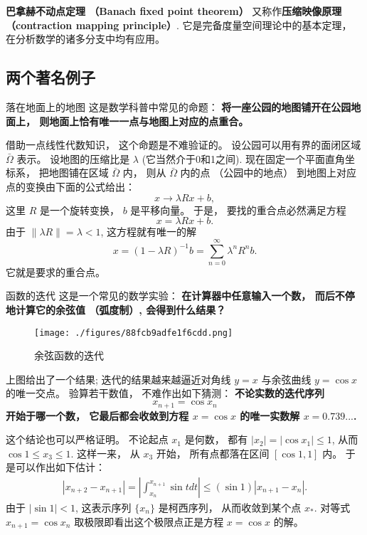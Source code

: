 

\textbf{巴拿赫不动点定理 （Banach fixed point theorem）} 又称作\textbf{压缩映像原理 （contraction mapping principle）}. 它是完备度量空间理论中的基本定理， 在分析数学的诸多分支中均有应用。

\subsection{两个著名例子}
\begin{example}{落在地面上的地图}
这是数学科普中常见的命题： \textbf{将一座公园的地图铺开在公园地面上， 则地面上恰有唯一一点与地图上对应的点重合。} 

借助一点线性代数知识， 这个命题是不难验证的。 设公园可以用有界的面闭区域 $\bar\Omega$ 表示。 设地图的压缩比是 $\lambda$ (它当然介于0和1之间). 现在固定一个平面直角坐标系， 把地图铺在区域 $\bar\Omega$ 内， 则从 $\bar\Omega$ 内的点 （公园中的地点） 到地图上对应点的变换由下面的公式给出：
$$
x\to \lambda Rx+b,
$$
这里 $R$ 是一个旋转变换， $b$ 是平移向量。 于是， 要找的重合点必然满足方程
$$
x=\lambda Rx+b.
$$
由于 $\|\lambda R\|=\lambda<1$, 这方程就有唯一的解
$$
x=(1-\lambda R)^{-1}b=\sum_{n=0}^{\infty}\lambda^nR^nb.
$$
它就是要求的重合点。
\end{example}

\begin{example}{函数的迭代}
这是一个常见的数学实验： \textbf{在计算器中任意输入一个数， 而后不停地计算它的余弦值 （弧度制）, 会得到什么结果？ }

\begin{figure}[ht]
\centering
\texttt{[image: ./figures/88fcb9adfe1f6cdd.png]}
\caption{余弦函数的迭代} \label{fig_ConMap_1}
\end{figure}

上图给出了一个结果; 迭代的结果越来越逼近对角线 $y=x$ 与余弦曲线 $y=\cos x$ 的唯一交点。 验算若干数值， 不难作出如下猜测： \textbf{不论实数的迭代序列
$$
x_{n+1}=\cos x_n
$$
开始于哪一个数， 它最后都会收敛到方程 $x=\cos x$ 的唯一实数解 $x=0.739...$.}

这个结论也可以严格证明。 不论起点 $x_1$ 是何数， 都有 $|x_2|=|\cos x_1|\leq 1$, 从而 $\cos 1\leq x_3\leq 1$. 这样一来， 从 $x_3$ 开始， 所有点都落在区间 $[\cos 1,1]$ 内。 于是可以作出如下估计：
$$
\begin{aligned}
|x_{n+2}-x_{n+1}|
=\left|\int_{x_{n}}^{x_{n+1}}\sin tdt\right|
\leq (\sin 1)|x_{n+1}-x_n|.
\end{aligned}
$$
由于 $|\sin1|<1$, 这表示序列 $\{x_n\}$ 是柯西序列， 从而收敛到某个点 $x_*$. 对等式 $x_{n+1}=\cos x_n$ 取极限即看出这个极限点正是方程 $x=\cos x$ 的解。
\end{example}


